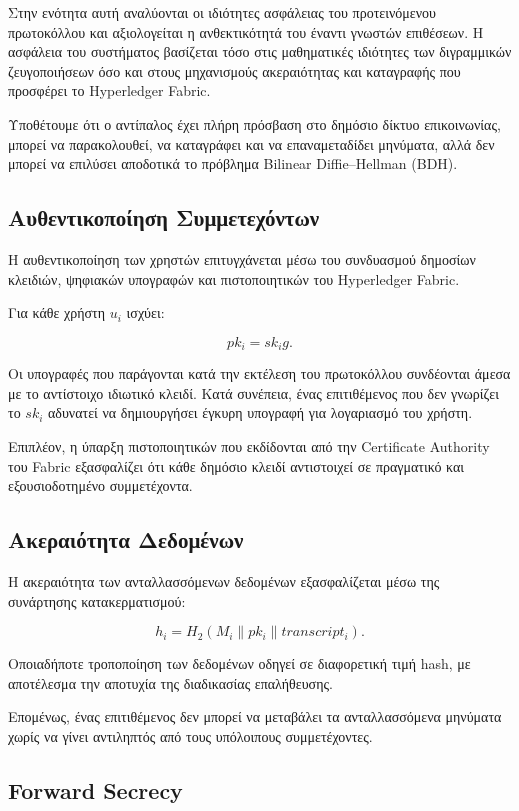 \documentclass[12pt,a4paper]{report}
\begin{document}
Στην ενότητα αυτή αναλύονται οι ιδιότητες ασφάλειας του προτεινόμενου πρωτοκόλλου και αξιολογείται η ανθεκτικότητά του έναντι γνωστών επιθέσεων. Η ασφάλεια του συστήματος βασίζεται τόσο στις μαθηματικές ιδιότητες των διγραμμικών ζευγοποιήσεων όσο και στους μηχανισμούς ακεραιότητας και καταγραφής που προσφέρει το Hyperledger Fabric.

Υποθέτουμε ότι ο αντίπαλος έχει πλήρη πρόσβαση στο δημόσιο δίκτυο επικοινωνίας, μπορεί να παρακολουθεί, να καταγράφει και να επαναμεταδίδει μηνύματα, αλλά δεν μπορεί να επιλύσει αποδοτικά το πρόβλημα Bilinear Diffie--Hellman (BDH).

\subsection{Αυθεντικοποίηση Συμμετεχόντων}

Η αυθεντικοποίηση των χρηστών επιτυγχάνεται μέσω του συνδυασμού δημοσίων κλειδιών, ψηφιακών υπογραφών και πιστοποιητικών του Hyperledger Fabric.

Για κάθε χρήστη $u_i$ ισχύει:

\[
pk_i = sk_i g.
\]

Οι υπογραφές που παράγονται κατά την εκτέλεση του πρωτοκόλλου συνδέονται άμεσα με το αντίστοιχο ιδιωτικό κλειδί. Κατά συνέπεια, ένας επιτιθέμενος που δεν γνωρίζει το $sk_i$ αδυνατεί να δημιουργήσει έγκυρη υπογραφή για λογαριασμό του χρήστη.

Επιπλέον, η ύπαρξη πιστοποιητικών που εκδίδονται από την Certificate Authority του Fabric εξασφαλίζει ότι κάθε δημόσιο κλειδί αντιστοιχεί σε πραγματικό και εξουσιοδοτημένο συμμετέχοντα.

\subsection{Ακεραιότητα Δεδομένων}

Η ακεραιότητα των ανταλλασσόμενων δεδομένων εξασφαλίζεται μέσω της συνάρτησης κατακερματισμού:

\[
h_i =
H_2
\left(
M_i
\parallel
pk_i
\parallel
transcript_i
\right).
\]

Οποιαδήποτε τροποποίηση των δεδομένων οδηγεί σε διαφορετική τιμή hash, με αποτέλεσμα την αποτυχία της διαδικασίας επαλήθευσης.

Επομένως, ένας επιτιθέμενος δεν μπορεί να μεταβάλει τα ανταλλασσόμενα μηνύματα χωρίς να γίνει αντιληπτός από τους υπόλοιπους συμμετέχοντες.

\subsection{Forward Secrecy}
\end{document}
